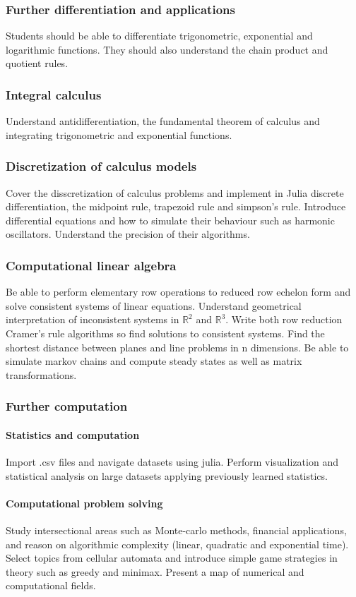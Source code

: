 \documentclass[12pt]{report}
\begin{document}
    \subsubsection{Further differentiation and applications} Students should be able to differentiate trigonometric, exponential and logarithmic functions. They should also understand the chain product and quotient rules.

    \subsubsection{Integral calculus} Understand antidifferentiation, the fundamental theorem of calculus and integrating trigonometric and exponential functions.

    \subsubsection{Discretization of calculus models} Cover the disscretization of calculus problems and implement in Julia discrete differentiation, the midpoint rule, trapezoid rule and simpson's rule. Introduce differential equations and how to simulate their behaviour such as harmonic oscillators. Understand the precision of their algorithms.

    \subsubsection{Computational linear algebra} Be able to perform elementary row operations to reduced row echelon form and solve consistent systems of linear equations. Understand geometrical interpretation of inconsistent systems in $\mathbb{R}^2$ and $\mathbb{R}^3$. Write both row reduction Cramer's rule algorithms so find solutions to consistent systems. Find the shortest distance between planes and line problems in n dimensions. Be able to simulate markov chains and compute steady states as well as matrix transformations.

    \subsubsection{Further computation} 
        \paragraph*{Statistics and computation} Import .csv files and navigate datasets using julia. Perform visualization and statistical analysis on large datasets applying previously learned statistics.

        \paragraph*{Computational problem solving} Study intersectional areas such as Monte-carlo methods, financial applications, and reason on algorithmic complexity (linear, quadratic and exponential time). Select topics from cellular automata and introduce simple game strategies in theory such as greedy and minimax. Present a map of numerical and computational fields.
\end{document}
